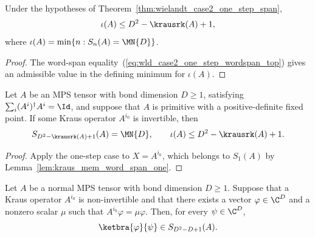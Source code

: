 \begin{corollary}%
    \label{cor:wielandt_case2_one_step_index}
    \leanok
    Under the hypotheses of Theorem~\ref{thm:wielandt_case2_one_step_span},
    \[
        \iota(A) \le D^2 - \krausrk(A) + 1,
    \]
    where $\iota(A)=\min\{n : S_n(A)=\MN{D}\}$.
\end{corollary}

\begin{proof}
    \leanok
    The word-span equality~(\ref{eq:wld_case2_one_step_wordspan_top}) gives an admissible value in the
    defining minimum for $\iota(A)$.
\end{proof}

\begin{corollary}%
    \label{cor:wielandt_case2_generator}
    \leanok
    Let $A$ be an MPS tensor with bond dimension $D \ge 1$, satisfying
    $\sum_i (A^i)^\dagger A^i=\Id$, and suppose that $A$ is primitive
    with a positive-definite fixed point. If some Kraus operator $A^{i_0}$
    is invertible, then
    \[
        S_{D^2 - \krausrk(A) + 1}(A)=\MN{D},
        \qquad
        \iota(A) \le D^2 - \krausrk(A) + 1.
    \]
\end{corollary}

\begin{proof}
    \leanok
    Apply the one-step case to $X=A^{i_0}$, which belongs to $S_1(A)$ by
    Lemma~\ref{lem:kraus_mem_word_span_one}.
\end{proof}

\begin{lemma}%
    \label{lem:rank_one_noninvertible_eigenvector}
    \leanok
    Let $A$ be a normal MPS tensor with bond dimension $D \ge 1$.
    Suppose that a Kraus operator $A^{i_0}$ is non-invertible and that
    there exists a vector $\varphi \in \C^D$ and a nonzero scalar $\mu$
    such that $A^{i_0}\varphi=\mu\varphi$. Then, for every
    $\psi \in \C^D$,
    \[
        \ketbra{\varphi}{\psi} \in S_{D^2 - D + 1}(A).
    \]
\end{lemma}

